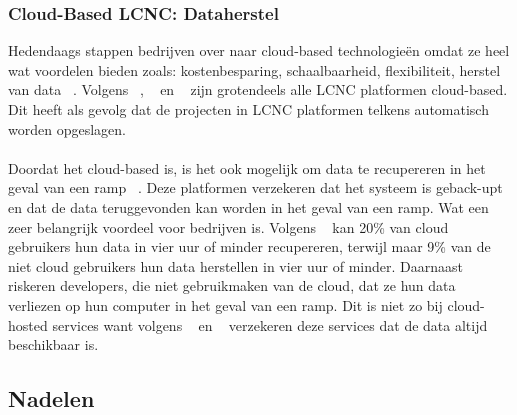 \subsubsection{Cloud-Based LCNC: Dataherstel}
\label{subsec:cloud-based-lcnc}
Hedendaags stappen bedrijven over naar cloud-based technologieën omdat ze heel wat voordelen bieden zoals: 
kostenbesparing, schaalbaarheid, flexibiliteit, herstel van data ~\autocite{Sufi_2023}. 
Volgens ~\textcites{Sufi_2023}, ~\textcite{Talesra_2021} en ~\textcite{Hintsch2021} zijn grotendeels alle LCNC platformen cloud-based. Dit heeft als gevolg dat de projecten in LCNC platformen telkens automatisch worden opgeslagen.
\\
\\
Doordat het cloud-based is, is het ook mogelijk om data te recupereren in het geval van een ramp ~\autocite{Sufi_2023}. 
Deze platformen verzekeren dat het systeem is geback-upt en dat de data teruggevonden kan worden in het geval van een ramp. 
Wat een zeer belangrijk voordeel voor bedrijven is. Volgens ~\textcite{Sufi_2023} kan 20\% van cloud gebruikers hun data in vier uur of minder recupereren, 
terwijl maar 9\% van de niet cloud gebruikers hun data herstellen in vier uur of minder. Daarnaast riskeren developers, die niet gebruikmaken van de cloud, 
dat ze hun data verliezen op hun computer in het geval van een ramp. 
Dit is niet zo bij cloud-hosted services want volgens ~\textcite{Sufi_2023} en ~\textcite{Chou_2015} verzekeren deze services dat de data altijd beschikbaar is.
\subsection{Nadelen}%
\label{subsec:nadelen}
